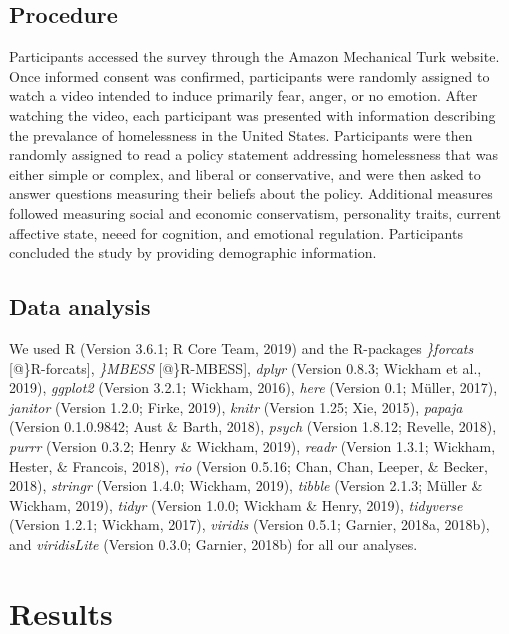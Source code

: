 \documentclass[man]{apa6}
\begin{document}
\hypertarget{procedure}{%
\subsection{Procedure}\label{procedure}}

Participants accessed the survey through the Amazon Mechanical Turk website. Once informed consent was confirmed, participants were randomly assigned to watch a video intended to induce primarily fear, anger, or no emotion. After watching the video, each participant was presented with information describing the prevalance of homelessness in the United States. Participants were then randomly assigned to read a policy statement addressing homelessness that was either simple or complex, and liberal or conservative, and were then asked to answer questions measuring their beliefs about the policy. Additional measures followed measuring social and economic conservatism, personality traits, current affective state, neeed for cognition, and emotional regulation. Participants concluded the study by providing demographic information.

\hypertarget{data-analysis}{%
\subsection{Data analysis}\label{data-analysis}}

We used R (Version 3.6.1; R Core Team, 2019) and the R-packages \emph{\}forcats} {[}@\}R-forcats{]}, \emph{\}MBESS} {[}@\}R-MBESS{]}, \emph{dplyr} (Version 0.8.3; Wickham et al., 2019), \emph{ggplot2} (Version 3.2.1; Wickham, 2016), \emph{here} (Version 0.1; Müller, 2017), \emph{janitor} (Version 1.2.0; Firke, 2019), \emph{knitr} (Version 1.25; Xie, 2015), \emph{papaja} (Version 0.1.0.9842; Aust \& Barth, 2018), \emph{psych} (Version 1.8.12; Revelle, 2018), \emph{purrr} (Version 0.3.2; Henry \& Wickham, 2019), \emph{readr} (Version 1.3.1; Wickham, Hester, \& Francois, 2018), \emph{rio} (Version 0.5.16; Chan, Chan, Leeper, \& Becker, 2018), \emph{stringr} (Version 1.4.0; Wickham, 2019), \emph{tibble} (Version 2.1.3; Müller \& Wickham, 2019), \emph{tidyr} (Version 1.0.0; Wickham \& Henry, 2019), \emph{tidyverse} (Version 1.2.1; Wickham, 2017), \emph{viridis} (Version 0.5.1; Garnier, 2018a, 2018b), and \emph{viridisLite} (Version 0.3.0; Garnier, 2018b) for all our analyses.

\hypertarget{results}{%
\section{Results}\label{results}}
\end{document}
